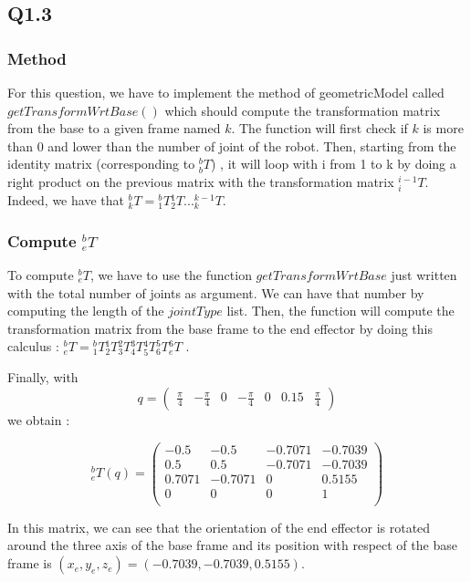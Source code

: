 \subsection{Q1.3}

\subsubsection{Method}
For this question, we have to implement the method of geometricModel called $getTransformWrtBase()$ which should compute the transformation matrix from the base to a given frame named $k$. The function will first check if $k$ is more than 0 and lower than the number of joint of the robot. Then, starting from the identity matrix (corresponding to  $^{b}_{b} T$) , it will loop with i from 1 to k by doing a right product on the previous matrix with the transformation matrix $^{i-1}_{i} T$. Indeed, we have that $^b_k T = {^b_1 T} {^1_2 T} ...  {^{k-1}_k T} $.

\subsubsection{Compute $^b_e T$}

To compute $^b_e T$, we have to use the function $getTransformWrtBase$ just written with the total number of joints as argument. We can have that number by computing the length of the $jointType$ list. Then, the function will compute the transformation matrix from the base frame to the end effector by doing this calculus : $^b_e T = {^b_1 T} {^1_2 T} {^2_3 T} {^3_4 T} {^4_5 T} {^5_6 T} {^6_e T} $ . 

Finally, with \[
q = \begin{pmatrix}
    \frac{\pi}{4} & -\frac{\pi}{4} & 0 & -\frac{\pi}{4} & 0 & 0.15 & \frac{\pi}{4}
\end{pmatrix}
\] we obtain : 

\[^b_e T(q) = \begin{pmatrix}
        -0.5 & -0.5 & -0.7071 & -0.7039 \\
        0.5 & 0.5 & -0.7071 & -0.7039 \\
        0.7071 & -0.7071 & 0 & 0.5155 \\
        0 & 0 & 0 & 1 \\
    \end{pmatrix}\]

In this matrix, we can see that the orientation of the end effector is rotated around the three axis of the base frame and its position with respect of the base frame is $(x_e,y_e,z_e)=(-0.7039, -0.7039, 0.5155)$.

